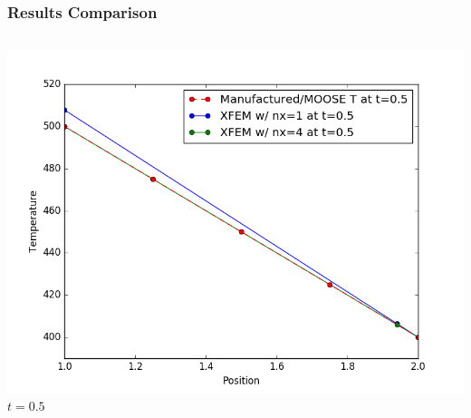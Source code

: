 \documentclass[]{beamer}
\begin{document}
\begin{frame}[t]\frametitle{Results Comparison}
  	\begin{columns}
			\begin{center}
			\includegraphics[scale=0.17]{figures/1D_rz_ls1mat_u_vs_x_05}\\
			$t=0.5$
			
			\null
			

\end{center}
\end{columns}
\end{frame}
\end{document}

